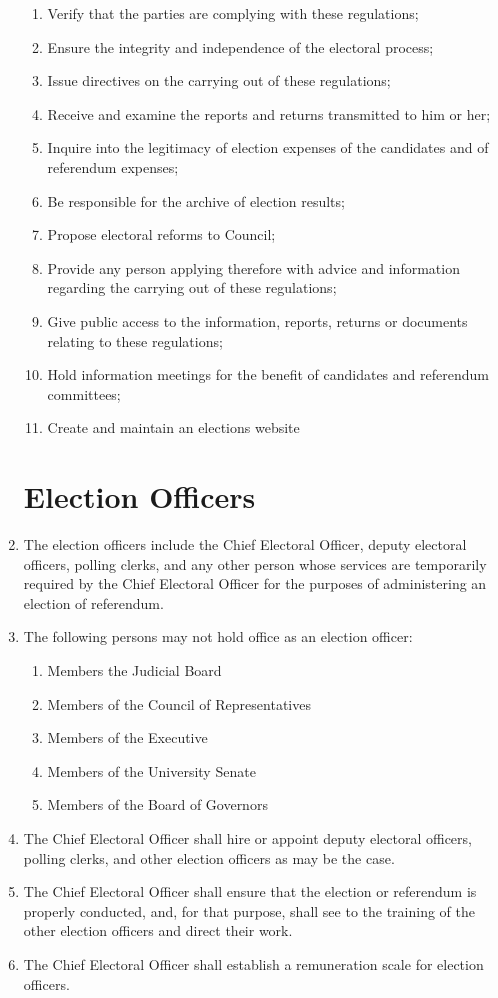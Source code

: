 \documentclass[oneside]{book}
\begin{document}
\begin{enumerate}
\begin{enumerate}
\item Verify that the parties are complying with these regulations; 
\item Ensure the integrity and independence of the electoral process; 
\item Issue directives on the carrying out of these regulations; 
\item Receive and examine the reports and returns transmitted to him or
her; 
\item Inquire into the legitimacy of election expenses of the candidates
and of referendum expenses; 
\item Be responsible for the archive of election results; 
\item Propose electoral reforms to Council; 
\item Provide any person applying therefore with advice and information
regarding the carrying out of these regulations; 
\item Give public access to the information, reports, returns or documents
relating to these regulations; 
\item Hold information meetings for the benefit of candidates and referendum
committees; 
\item Create and maintain an elections website 
\end{enumerate}
\section{\label{Election_Officers}Election Officers }
\item The election officers include the Chief Electoral Officer, deputy
electoral officers, polling clerks, and any other person whose services
are temporarily required by the Chief Electoral Officer for the purposes
of administering an election of referendum. 
\item The following persons may not hold office as an election officer: 

\begin{enumerate}
\item Members the Judicial Board 
\item Members of the Council of Representatives 
\item Members of the Executive 
\item Members of the University Senate 
\item Members of the Board of Governors 
\end{enumerate}
\item The Chief Electoral Officer shall hire or appoint deputy electoral
officers, polling clerks, and other election officers as may be the
case. 
\item The Chief Electoral Officer shall ensure that the election or referendum
is properly conducted, and, for that purpose, shall see to the training
of the other election officers and direct their work. 
\item The Chief Electoral Officer shall establish a remuneration scale for
election officers. 


\end{enumerate}
\end{document}
